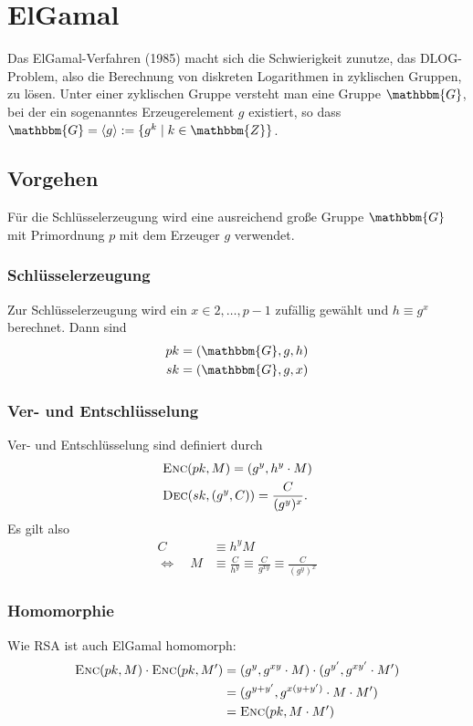 \section{ElGamal}
\label{ch:asymenc:elgamal} Das ElGamal-Verfahren \indexElGamal (1985) macht sich die
Schwierigkeit zunutze, das DLOG-Problem\indexDLOGProblem, also die Berechnung von
diskreten Logarithmen in zyklischen Gruppen, zu lösen. Unter einer
zyklischen Gruppe versteht man eine Gruppe $\mathbbm{G}$, bei der ein
sogenanntes Erzeugerelement $g$ existiert, so dass $\mathbbm{G} =
\langle g \rangle := \{g^k \mid k \in \mathbbm{Z}\}$.

\subsection{Vorgehen} 
Für die Schlüsselerzeugung wird eine ausreichend große Gruppe
$\mathbbm{G}$ mit Primordnung $p$ mit dem Erzeuger $g$ verwendet. 
\subsubsection{Schlüsselerzeugung}
Zur Schlüsselerzeugung wird ein $x \in {2,\dots, p-1}$ zufällig gewählt
und $h \equiv g^x$ berechnet. Dann sind
\begin{align*}
pk &= (\mathbbm{G}, g, h)\\ 
sk &= (\mathbbm{G}, g, x)
\end{align*}

\subsubsection{Ver- und Entschlüsselung}
Ver- und Entschlüsselung sind definiert durch
\begin{align*} 
&\textsc{Enc}(pk, M) = (g^y, h^y \cdot M) \\ 
&\textsc{Dec}(sk, (g^y, C))
= \frac{C}{(g^y)^x}.
\end{align*}
Es gilt also 
\begin{align*}
  C &\equiv h^y M \\
 \Leftrightarrow \quad M& \equiv \frac{C}{h^y} \equiv \frac{C}{g^{xy}} \equiv \frac{C}{(g^y)^x}
\end{align*}

\subsubsection{Homomorphie}
Wie RSA ist auch ElGamal homomorph:
\begin{align*} 
\textsc{Enc}({pk,M}) \cdot \textsc{Enc}({pk,M'}) &= (g^y, g^{xy} \cdot M) \cdot (g^{y'},
                                   g^{xy'} \cdot M')\\ 
                                 &= (g^{y+y'}, g^{x(y + y')} \cdot M
                                   \cdot M')\\ 
                                 &= \textsc{Enc}({pk, M \cdot M'})
\end{align*}

